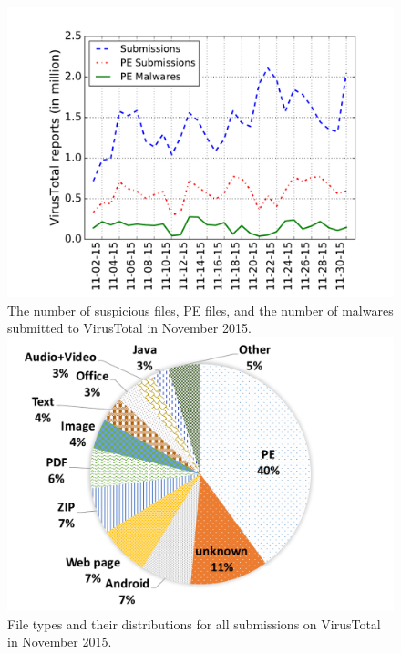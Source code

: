 \begin{figure}[!htb]
  \includegraphics[width=\linewidth]{figure/nov}
{
The number of suspicious files, PE files, and the number of malwares submitted to VirusTotal in November 2015. 
}
\endminipage\hfill
{}
  \includegraphics[width=\linewidth]{figure/typePie}
  {
  File types and their distributions for all submissions on VirusTotal in November 2015.
  }
\endminipage\hfill
{}%

\end{figure}
